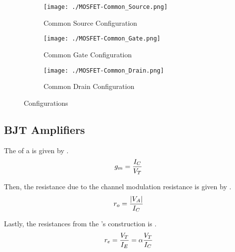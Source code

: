 \begin{figure}[h!tbp]
  \centering
  \begin{subfigure}{0.30\linewidth}
    \centering
    \texttt{[image: ./MOSFET-Common\_Source.png]}
    \caption{Common Source Configuration\\\parencite[p.~424]{sedraTextbook7}}
    \label{fig:MOSFET-Common_Source}
  \end{subfigure}
  \begin{subfigure}{0.30\linewidth}
    \centering
    \texttt{[image: ./MOSFET-Common\_Gate.png]}
    \caption{Common Gate Configuration\\\parencite[p.~424]{sedraTextbook7}}
    \label{fig:MOSFET-Common_Gate}
  \end{subfigure}
  \begin{subfigure}{0.30\linewidth}
    \centering
    \texttt{[image: ./MOSFET-Common\_Drain.png]}
    \caption{Common Drain Configuration\\\parencite[p.~424]{sedraTextbook7}}
    \label{fig:MOSFET-Common_Drain}
  \end{subfigure}
  \caption{ Configurations}
  \label{fig:MOSFET_Configurations}
\end{figure}

\subsection{BJT Amplifiers}\label{subsec:BJT_Amps}
The  of a  is given by .
\begin{equation}\label{eq:BJT-Transconductance_Gain}
  \TransconductanceGain = \frac{\DCCurrent{\Collector}}{\ThermalVoltage}
\end{equation}

Then, the resistance due to the channel modulation resistance is given by .
\begin{equation}\label{eq:BJT-Transistor_Resistance}
  \ChannelModResist = \frac{\Abs{\DCVoltage{A}}}{\DCCurrent{\Collector}}
\end{equation}

Lastly, the resistances from the 's construction is .
\begin{equation}\label{eq:BJT-Emitter_Resistance}
  r_{e} = \frac{\ThermalVoltage}{\DCCurrent{\Emitter}} = \alpha \frac{\ThermalVoltage}{\DCCurrent{\Collector}}
\end{equation}

